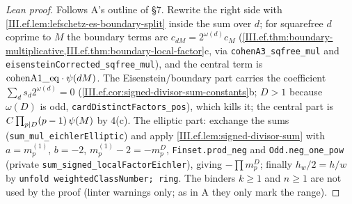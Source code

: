 \begin{proof}[Lean proof]
Follows A's outline of \S7. Rewrite the right side with \cref{III.ef.lem:lefschetz-es-boundary-split} inside the sum over $d$; for squarefree $d$ coprime to $M$ the boundary terms are $c_{dM}=2^{\omega(d)}c_M$ (\cref{III.ef.thm:boundary-multiplicative,III.ef.thm:boundary-local-factor}c, via \texttt{cohenA3\_sqfree\_mul} and \texttt{eisensteinCorrected\_sqfree\_mul}), and the central term is $\mathrm{cohenA1\_eq}\cdot\psi(dM)$. The Eisenstein/boundary part carries the coefficient $\sum_d s_d2^{\omega(d)}=0$ (\cref{III.ef.cor:signed-divisor-sum-constants}b; $D>1$ because $\omega(D)$ is odd, \texttt{cardDistinctFactors\_pos}), which kills it; the central part is $C\prod_{p\mid D}(p-1)\,\psi(M)$ by 4(c). The elliptic part: exchange the sums (\texttt{sum\_mul\_eichlerElliptic}) and apply \cref{III.ef.lem:signed-divisor-sum} with $a=m^{(1)}_p$, $b=-2$, $m^{(1)}_p-2=-m^D_p$, \texttt{Finset.prod\_neg} and \texttt{Odd.neg\_one\_pow} (private \texttt{sum\_signed\_localFactorEichler}), giving $-\prod m^D_p$; finally $h_w/2=h/w$ by \texttt{unfold weightedClassNumber; ring}. The binders $k\ge1$ and $n\ge1$ are not used by the proof (linter warnings only; as in A they only mark the range).
\end{proof}

